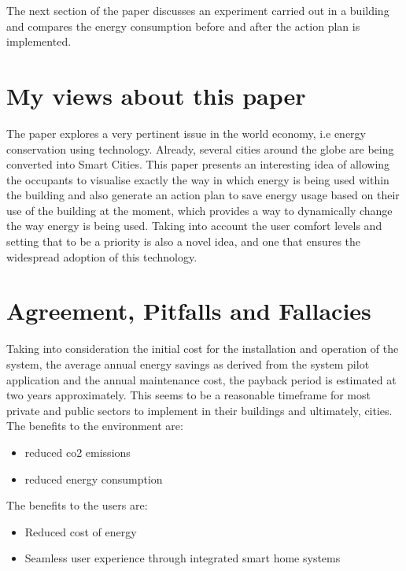 \documentclass{report}
\begin{document}
\begin{enumerate}
    The next section of the paper discusses an experiment carried out in a building and compares the energy consumption before and after the action plan is implemented. 
    
 \end{enumerate}

    \section*{My views about this paper}
    The paper explores a very pertinent issue in the world economy, i.e energy conservation using technology. Already, several cities around the globe are being converted into Smart Cities. This paper presents an interesting idea of allowing the occupants to visualise exactly the way in which energy is being used within the building and also generate an action plan to save energy usage based on their use of the building at the moment, which provides a way to dynamically change the way energy is being used. Taking into account the user comfort levels and setting that to be a priority is also a novel idea, and one that ensures the widespread adoption of this technology. 
    
    \section*{Agreement, Pitfalls and Fallacies}
    Taking into consideration the initial cost for the installation and operation of the system, the average annual energy savings as derived from the system pilot application and the annual maintenance cost, the payback period is estimated at two years approximately. This seems to be a reasonable timeframe for most private and public sectors to implement in their buildings and ultimately, cities. \\
   
    The benefits to the environment are:
    \begin{itemize}
        \item reduced co2 emissions
        \item reduced energy consumption
    \end{itemize}

    The benefits to the users are:
    \begin{itemize}
        \item Reduced cost of energy
        \item Seamless user experience through integrated smart home systems
    \end{itemize}
    
\end{document}
